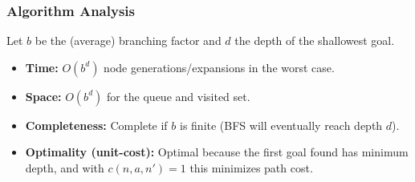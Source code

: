   \subsubsection{Algorithm Analysis}
  Let $b$ be the (average) branching factor and $d$ the depth of the shallowest goal.
  \begin{itemize}
    \item \textbf{Time:} $O(b^d)$ node generations/expansions in the worst case.
    \item \textbf{Space:} $O(b^d)$ for the queue and visited set.
    \item \textbf{Completeness:} Complete if $b$ is finite (BFS will eventually reach depth $d$).
    \item \textbf{Optimality (unit-cost):} Optimal because the first goal found has minimum depth, and with $c(n,a,n')=1$ this minimizes path cost.
  \end{itemize}
